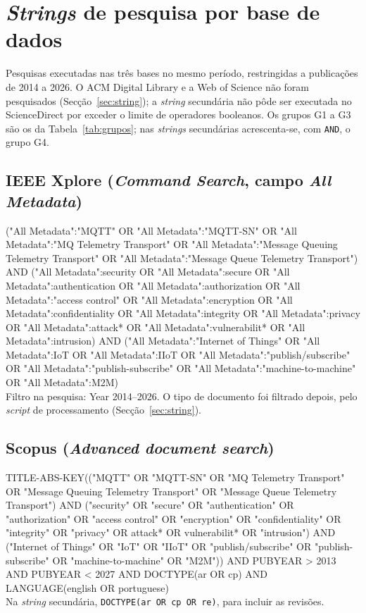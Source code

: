 \section{\emph{Strings} de pesquisa por base de dados}
\label{anx:strings}

Pesquisas executadas nas três bases no mesmo período, restringidas a publicações de 2014 a
2026. O ACM Digital Library e a Web of Science não foram pesquisados
(Secção~\ref{sec:string}); a \emph{string} secundária não pôde ser executada no
ScienceDirect por exceder o limite de operadores booleanos. Os grupos G1 a
G3 são os da Tabela~\ref{tab:grupos}; nas \emph{strings} secundárias acrescenta-se,
com \texttt{AND}, o grupo G4.

\newcommand{\str}[1]{\noindent\begin{minipage}{\linewidth}\footnotesize\ttfamily\raggedright #1\end{minipage}}

\subsection*{IEEE Xplore (\emph{Command Search}, campo \emph{All Metadata})}
\str{("All Metadata":"MQTT" OR "All Metadata":"MQTT-SN" OR "All Metadata":"MQ Telemetry Transport"
OR "All Metadata":"Message Queuing Telemetry Transport" OR "All Metadata":"Message Queue Telemetry Transport")
AND ("All Metadata":security OR "All Metadata":secure OR "All Metadata":authentication
OR "All Metadata":authorization OR "All Metadata":"access control" OR "All Metadata":encryption
OR "All Metadata":confidentiality OR "All Metadata":integrity OR "All Metadata":privacy
OR "All Metadata":attack* OR "All Metadata":vulnerabilit* OR "All Metadata":intrusion)
AND ("All Metadata":"Internet of Things" OR "All Metadata":IoT OR "All Metadata":IIoT
OR "All Metadata":"publish/subscribe" OR "All Metadata":"publish-subscribe"
OR "All Metadata":"machine-to-machine" OR "All Metadata":M2M)\\
Filtro na pesquisa: Year 2014--2026. O tipo de documento foi filtrado depois, pelo
\emph{script} de processamento (Secção~\ref{sec:string}).}

\subsection*{Scopus (\emph{Advanced document search})}
\str{TITLE-ABS-KEY(("MQTT" OR "MQTT-SN" OR "MQ Telemetry Transport"
OR "Message Queuing Telemetry Transport" OR "Message Queue Telemetry Transport")
AND ("security" OR "secure" OR "authentication" OR "authorization" OR "access control"
OR "encryption" OR "confidentiality" OR "integrity" OR "privacy" OR attack* OR vulnerabilit*
OR "intrusion")
AND ("Internet of Things" OR "IoT" OR "IIoT" OR "publish/subscribe" OR "publish-subscribe"
OR "machine-to-machine" OR "M2M"))
AND PUBYEAR > 2013 AND PUBYEAR < 2027 AND DOCTYPE(ar OR cp)
AND LANGUAGE(english OR portuguese)\\
Na \emph{string} secundária, \texttt{DOCTYPE(ar OR cp OR re)}, para incluir as revisões.}

